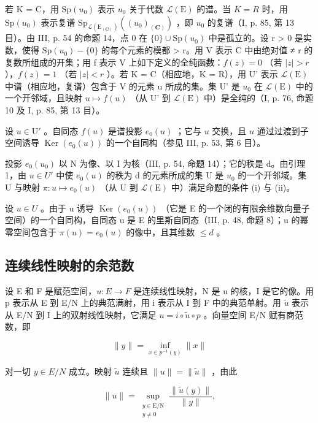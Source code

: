 若 K = C，用 \(\mathrm{Sp}(u_{0})\) 表示 \(u_{0}\) 关于代数 \(\mathcal{L}(\mathrm{E})\) 的谱。当 \(K = R\) 时，用 \(\mathrm{Sp}(u_{0})\) 表示复谱 \(\mathrm{Sp}_{\mathcal{L}(\mathrm{E}_{(\mathbf{C})})}((u_{0})_{(\mathbf{C})})\) ，即 \(u_{0}\) 的复谱（I, p. 85, 第 13 目）。由 III, p. 54 的命题 14，点 0 在 \(\{0\} \cup \mathrm{Sp}(u_{0})\) 中是孤立的。设 r \textgreater{} 0 是实数，使得 \(\mathrm{Sp}(u_{0}) - \{0\}\) 的每个元素的模都 \textgreater{} r。用 V 表示 C 中由绝对值 ≠ r 的复数所组成的开集；用 f 表示 V 上如下定义的全纯函数：\(f(z) = 0\) （若 \(|z| > r\) ），\(f(z) = 1\) （若 \(|z| < r\) ）。若 K = C（相应地，K = R），用 U' 表示 \(\mathcal{L}(\mathrm{E})\) 中谱（相应地，复谱）包含于 V 的元素 u 所成的集。集 U' 是 \(u_{0}\) 在 \(\mathcal{L}(\mathrm{E})\) 中的一个开邻域，且映射 \(u \mapsto f(u)\) （从 U' 到 \(\mathcal{L}(\mathrm{E})\) 中）是全纯的（I, p. 76, 命题 10 及 I, p. 85, 第 13 目）。

设 \(u \in \mathrm{U}'\) 。自同态 \(f(u)\) 是谱投影 \(e_0(u)\) ；它与 \(u\) 交换，且 \(u\) 通过过渡到子空间诱导 \(\operatorname{Ker}(e_0(u))\) 的一个自同构（参见 III, p. 53, 第 6 目）。

投影 \(e_{0}(u_{0})\) 以 N 为像、以 I 为核（III, p. 54, 命题 14）；它的秩是 d。由引理 1，由 \(u \in U'\) 中使 \(e_{0}(u)\) 的秩为 d 的元素所成的集 U 是 \(u_{0}\) 的一个开邻域。集 U 与映射 \(\pi: u \mapsto e_{0}(u)\) （从 U 到 \(\mathcal{L}(\mathrm{E})\) 中）满足命题的条件 (i) 与 (ii)。

设 \(u \in U\) 。由于 u 诱导 \(\operatorname{Ker}(e_{0}(u))\) （它是 E 的一个闭的有限余维数向量子空间）的一个自同构，自同态 u 是 E 的里斯自同态（III, p. 48, 命题 8）；u 的幂零空间包含于 \(\pi(u) = e_{0}(u)\) 的像中，且其维数 \(\leqslant d\) 。

\subsection{连续线性映射的余范数}

设 E 和 F 是赋范空间，\(u: E \rightarrow F\) 是连续线性映射，N 是 u 的核，I 是它的像。用 p 表示从 E 到 E/N 上的典范满射，用 i 表示从 I 到 F 中的典范单射。用 \(\widetilde{u}\) 表示从 E/N 到 I 上的双射线性映射，它满足 \(u = i \circ \widetilde{u} \circ p\) 。向量空间 E/N 赋有商范数，即

\[
\| y \| = \inf _ {x \in p^{-1}(y)} \| x \|\tag{2}
\]

对一切 \(y \in E/N\) 成立。映射 \(\widetilde{u}\) 连续且 \(\|u\| = \|\widetilde{u}\|\) ，由此

\[
\| u\| = \sup_{\substack{y\in \mathrm{E / N}\\ y\neq 0}}\frac{\|\widetilde{u} (y)\|}{\|y\|},\tag{3}
\]

